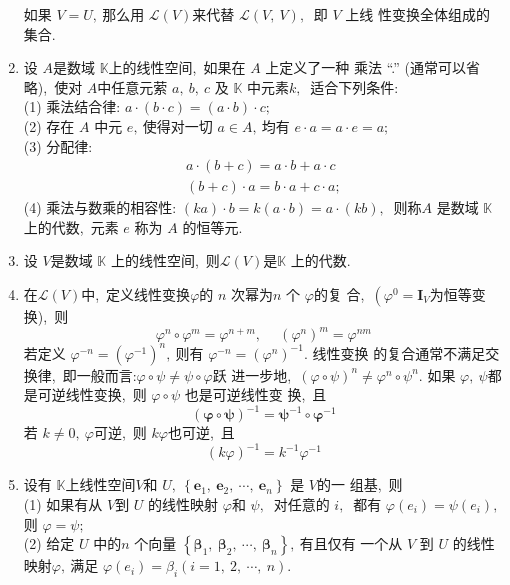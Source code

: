 \begin{enumerate}
		如果 $ V=U ,\ $那么用  $\mathcal{L}(V)  $来代替 $ \mathcal{L}(V,\  V) ,\ $ 即  $V $ 上线 性变换全体组成的集合.
		\item 设  $A  $是数域  $\mathbb{K}  $上的线性空间,\ 如果在 $ A$  上定义了一种 乘法 “.” (通常可以省略),\  使对  $A  $中任意元萦 $ a,\  b,\  c $ 及 $ \mathbb{K} $ 中元素$  k ,\ $ 适合下列条件:\\
		(1) 乘法结合律: $ a \cdot(b \cdot c)=(a \cdot b) \cdot c ;$\\
		(2) 存在 $ A $ 中元 $ e ,\  $使得对一切  $a \in A ,\  $均有 $ e \cdot a=a \cdot e=a ;$\\
		(3) 分配律:
		$$\begin{array}{l}
			a \cdot(b+c)=a \cdot b+a \cdot c \\
			(b+c) \cdot a=b \cdot a+c \cdot a ;
		\end{array}$$
		(4) 乘法与数乘的相容性: $ (k a) \cdot b=k(a \cdot b)=a \cdot(k b) ,\ $ 则称$  A $ 是数域 $ \mathbb{K}$ 上的代数,\  元素  $e$  称为  $A $ 的恒等元.
		\item 设 $ V  $是数域  $\mathbb{K} $ 上的线性空间,\  则$  \mathcal{L}(V)  $是$  \mathbb{K} $ 上的代数.
		\item 在$  \mathcal{L}(V)  $中,\  定义线性变换$  \varphi  $的 $ n$  次幂为$  n$  个  $\varphi  $的复 合,\   $\left(\varphi^{0}=\boldsymbol{I}_{V}\right.  $为恒等变换),\  则
		$$\varphi^{n} \circ \varphi^{m}=\varphi^{n+m},\  \quad\left(\varphi^{n}\right)^{m}=\varphi^{n m}$$
		若定义 $ \varphi^{-n}=\left(\varphi^{-1}\right)^{n} ,\  $则有  $\varphi^{-n}=\left(\varphi^{n}\right)^{-1} .$ 线性变换 的复合通常不满足交换律,\ 即一般而言:$  \varphi \circ \psi \neq \psi \circ \varphi  $跃 进一步地,\ $  (\varphi \circ \psi)^{n} \neq \varphi^{n} \circ \psi^{n} .$
		如果 $ \varphi,\  \psi  $都是可逆线性变换,\ 则  $\varphi \circ \psi $ 也是可逆线性变 换,\  且
		$$(\boldsymbol{\varphi} \circ \boldsymbol{\psi})^{-1}=\boldsymbol{\psi}^{-1} \circ \boldsymbol{\varphi}^{-1}$$
		若  $k \neq 0,\  \varphi  $可逆,\  则 $ k \varphi  $也可逆,\  且
		$$(k \varphi)^{-1}=k^{-1} \varphi^{-1}$$
		\item 设有 $ \mathbb{K}  $上线性空间$  V  $和  $U,\ \left\{\boldsymbol{e}_{1},\  \boldsymbol{e}_{2},\  \cdots,\  \boldsymbol{e}_{n}\right\} $ 是  $V  $的一 组基,\  则\\
		(1) 如果有从 $ V  $到 $ U $ 的线性映射 $ \varphi  $和  $\psi ,\ $ 对任意的  $i ,\ $ 都有  $\varphi\left(e_{i}\right)=\psi\left(e_{i}\right) ,\  $则  $\varphi=\psi ;$\\
		(2) 给定 $U $ 中的$  n $ 个向量  $\left\{\boldsymbol{\beta}_{1},\  \boldsymbol{\beta}_{2},\  \cdots,\  \boldsymbol{\beta}_{n}\right\} ,\  $有且仅有 一个从  $V $ 到  $U $ 的线性映$射  \varphi ,\  $满足  $\varphi\left(e_{i}\right)=\beta_{i}(i=   1,\ 2,\  \cdots,\  n) .$

\end{enumerate}
